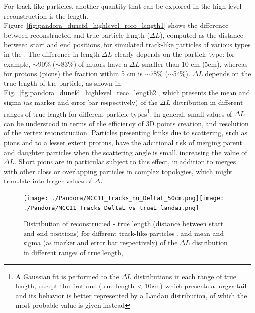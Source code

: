 For track-like particles, another quantity that can be explored in the high-level reconstruction is the length. Figure~\ref{fig:pandora_dunefd_highlevel_reco_length1} shows the difference between reconstructed and true particle length ($\Delta L$), computed as the \threed distance between start and end positions, for simulated track-like particles of various types in the . The difference in length $\Delta L$ clearly depends on the particle type: for example, $\sim$90\% ($\sim$83\%) of muons have a $\Delta L$ smaller than 10 cm (5cm), whereas for protons (pions) the fraction within 5 cm is $\sim$78\% ($\sim$54\%). $\Delta L$ depends on the true length of the particle, as shown in Fig.~\ref{fig:pandora_dunefd_highlevel_reco_length2}, which presents the mean and sigma (as marker and error bar respectively) of the $\Delta L$ distribution in different ranges of true length for different particle types\footnote{A Gaussian fit is performed to the $\Delta L$ distributions in each range of true length, except the first one (true length < 10cm) which presents a larger tail and its behavior is better represented by a Landau distribution, of which the most probable value is given instead}. In general, small values of $\Delta L$ can be understood in terms of the efficiency of 3D points creation, and resolution of the vertex reconstruction. Particles presenting kinks due to scattering, such as pions and to a lesser extent protons, have the additional risk of merging parent and daughter particles when the scattering angle is small, increasing the value of $\Delta L$. Short pions are in particular subject to this effect, in addition to merges with other close or overlapping particles in complex topologies, which might translate into larger values of $\Delta L$. 

\begin{figure}[!ht]   %
\centering
\subfloat[]{\label{fig:pandora_dunefd_highlevel_reco_length1}}\texttt{[image: ./Pandora/MCC11\_Tracks\_nu\_DeltaL\_50cm.png]}\subfloat[]{\label{fig:pandora_dunefd_highlevel_reco_length2}}\texttt{[image: ./Pandora/MCC11\_Tracks\_DeltaL\_vs\_trueL\_landau.png]}
\caption[Distribution of reconstructed-true length for different track-like particles]{Distribution of reconstructed - true length (\threed distance between start and end positions) for different track-like particles \protect{}, and mean and sigma (as marker and error bar respectively) of the $\Delta L$ distribution in different ranges of true length\protect{},}
\label{fig:pandora_dunefd_highlevel_reco_length}
\end{figure}

